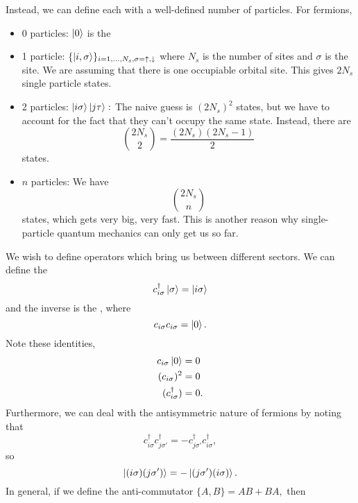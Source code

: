 \documentclass{article}
\numberwithin{equation}{section}
\begin{document}
Instead, we can define  each with a well-defined number of particles. For fermions,
\begin{itemize}
    \item 0 particles: $\ket{0}$ is the 
    \item 1 particle: $\{\ket{i,\sigma}\}_{i=1,\dots,N_s,\sigma=\uparrow,\downarrow}$ where $N_s$ is the number of sites and $\sigma$ is the site. We are assuming that there is one occupiable orbital site. This gives $2N_s$ single particle states.
    \item 2 particles: $\ket{i\sigma}\ket{j\tau}:$ The naive guess is $(2N_s)^2$ states, but we have to account for the fact that they can't occupy the same state. Instead, there are 
    \begin{equation}
        \binom{2N_s}{2} = \frac{(2N_s)(2N_s-1)}{2} 
    \end{equation}
    states.
    \item $n$ particles: We have 
    \begin{equation}
        \binom{2N_s}{n}
    \end{equation}
    states, which gets very big, very fast. This is another reason why single-particle quantum mechanics can only get us so far.
\end{itemize}
We wish to define operators which bring us between different sectors. We can define the 
\begin{equation}
    c^\dagger_{i\sigma}\ket{\sigma} = \ket{i\sigma}
\end{equation}
and the inverse is the , where
\begin{equation}
    c_{i\sigma}c_{i\sigma} = \ket{0}.
\end{equation}
Note these identities, 
\begin{align}
    c_{i\sigma}\ket{0} &= 0 \\ 
    (c_{i\sigma})^2 &= 0 \\ 
    (c^\dagger_{i\sigma}) &= 0.
\end{align}
Furthermore, we can deal with the antisymmetric nature of fermions by noting that 
\begin{equation}
    c^\dagger_{i\sigma}c^\dagger_{j\sigma'} = -c^\dagger_{j\sigma'}c^\dagger_{i\sigma},
\end{equation}
so
\begin{equation}
    \ket{(i\sigma)(j\sigma')} = -\ket{(j\sigma')(i\sigma)}.
\end{equation}
In general, if we define the anti-commutator $\{A,B\}=AB+BA,$ then 
\end{document}
